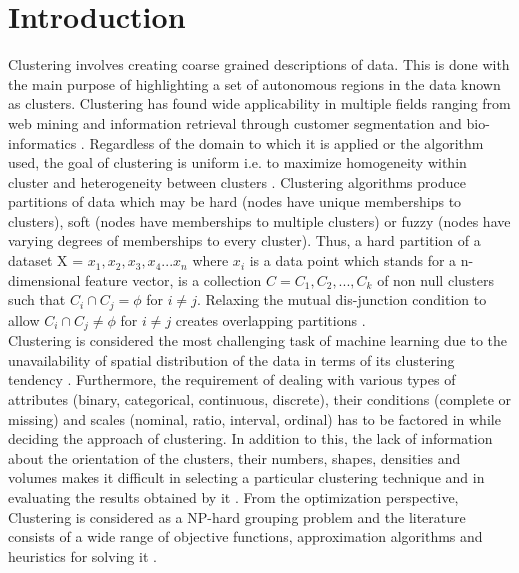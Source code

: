 \documentclass[conference]{IEEEtran}
\begin{document}
%
\IEEEpeerreviewmaketitle



\section{Introduction}
Clustering involves creating coarse grained descriptions of data. This is done with the main purpose of highlighting a set of autonomous regions in the data known as clusters. Clustering has found wide applicability in multiple fields ranging from web mining and information retrieval through customer segmentation and bio-informatics \cite{hur}. Regardless of the domain to which it is applied or the algorithm used, the goal of clustering is uniform i.e. to maximize homogeneity within cluster and heterogeneity between clusters \cite{cha}. Clustering algorithms produce partitions of data which may be hard (nodes have unique memberships to clusters), soft (nodes have memberships to multiple clusters) or fuzzy (nodes have varying degrees of memberships to every cluster). Thus, a hard partition of a dataset X = ${x_1, x_2, x_3, x_4 ... x_n}$ where $x_i$ is a data point which stands for a n-dimensional feature vector, is a collection $C = {C_1, C_2, ... , C_k}$ of non null clusters such that $C_i \cap C_j = \phi$ for $ i \neq j$. Relaxing the mutual dis-junction condition to allow $C_i \cap C_j \neq \phi$ for $ i \neq j$ creates overlapping partitions \cite{ma}. \\

Clustering is considered the most challenging task of machine learning due to the unavailability of spatial distribution of the data in terms of its clustering tendency \cite{hur} \cite{cha} \cite{ma}. Furthermore, the requirement of dealing with various types of attributes (binary, categorical, continuous, discrete), their conditions (complete or missing) and scales (nominal, ratio, interval, ordinal) has to be factored in while deciding the approach of clustering.  In addition to this, the lack of information about the orientation of the clusters, their numbers, shapes, densities and volumes makes it difficult in selecting a particular clustering technique and in evaluating the results obtained by it \cite{val1} \cite{val2}. From the optimization perspective, Clustering is considered as a NP-hard grouping problem and the literature consists of a wide range of objective functions, approximation algorithms and heuristics for solving it \cite{hur}.\\
\end{document}
